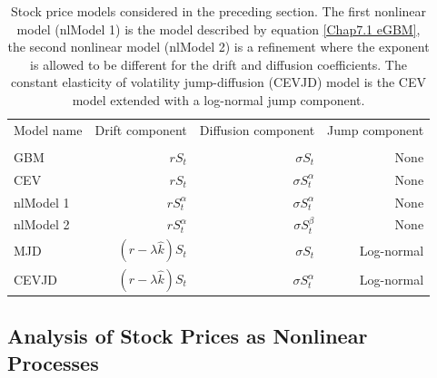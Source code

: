 \begin{table}
	\newcommand{\ra}[1]{\renewcommand{\arraystretch}{#1}}
	\ra{1.3}
	\centering
	{\setlength{\tabcolsep}{0.35em}
		\begin{tabular}{@{}lrrr@{}}
			\toprule
			\multicolumn{1}{c}{Model name} & 
			\multicolumn{1}{c}{Drift component} & 
			\multicolumn{1}{c}{Diffusion component} & 
			\multicolumn{1}{c}{Jump component} \\
			\cmidrule(r){1-1} \cmidrule(r){2-2} \cmidrule(r){3-3} \cmidrule(r){4-4} \\
			GBM & $rS_t$ & $\sigma S_t$ & None \\
			CEV & $rS_t$ & $\sigma S_t^\alpha$ & None \\
			nlModel 1 & $rS_t^\alpha$ & $\sigma S_t^\alpha$ & None \\
			nlModel 2 & $rS_t^\alpha$ & $\sigma S_t^\beta$ & None \\
			MJD & $(r-\lambda\hat{k})S_t$ & $\sigma S_t$ & Log-normal \\
			CEVJD & $(r-\lambda\hat{k})S_t$ & $\sigma S_t^\alpha$ & Log-normal \\
			\bottomrule
		\end{tabular}
	}
	\caption[Stock price models]{Stock price models considered in the preceding section.
		The first nonlinear model (nlModel 1) is the model described by equation \eqref{Chap7.1 eGBM}, the second nonlinear model (nlModel 2) is a refinement where the exponent is allowed to be different for the drift and diffusion coefficients. The constant elasticity of volatility jump-diffusion (CEVJD) model is the CEV model extended with a log-normal jump component.} \label{tab: stock price models}
\end{table}







\subsection{Analysis of Stock Prices as Nonlinear Processes}

